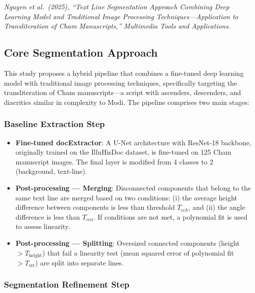 \documentclass[11pt, a4paper]{article}
\begin{document}
\noindent\textit{Nguyen et al.\ (2025), ``Text Line Segmentation Approach Combining Deep Learning Model and Traditional Image Processing Techniques---Application to Transliteration of Cham Manuscripts,'' Multimedia Tools and Applications.}

\subsection{Core Segmentation Approach}

This study proposes a hybrid pipeline that combines a fine-tuned deep learning model with traditional image processing techniques, specifically targeting the transliteration of Cham manuscripts---a script with ascenders, descenders, and diacritics similar in complexity to Modi. The pipeline comprises two main stages:

\subsubsection{Baseline Extraction Step}

\begin{itemize}[leftmargin=1.5em]
    \item \textbf{Fine-tuned docExtractor}: A U-Net architecture with ResNet-18 backbone, originally trained on the IlluHisDoc dataset, is fine-tuned on 125 Cham manuscript images. The final layer is modified from 4 classes to 2 (background, text-line).
    
    \item \textbf{Post-processing --- Merging}: Disconnected components that belong to the same text line are merged based on two conditions: (i) the average height difference between components is less than threshold $T_{cch}$, and (ii) the angle difference is less than $T_{cca}$. If conditions are not met, a polynomial fit is used to assess linearity.
    
    \item \textbf{Post-processing --- Splitting}: Oversized connected components (height $> T_{\text{height}}$) that fail a linearity test (mean squared error of polynomial fit $> T_{\text{err}}$) are split into separate lines.
\end{itemize}

\subsubsection{Segmentation Refinement Step}
\end{document}
